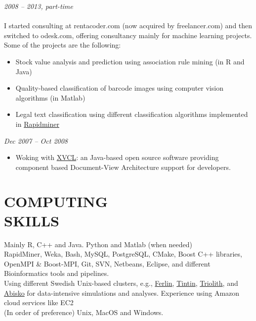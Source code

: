 \documentclass[margin, 10pt]{res} %
\begin{document}
\begin{resume}
{\sl \textbf{}} \hfill \textit{2008 -- 2013, part-time} \\
{\color{RubineRed}{Upwork (formerly Odesk)} } \\
I started consulting at rentacoder.com (now acquired by freelancer.com) and then switched to odesk.com, offering consultancy mainly for machine learning projects. Some of the projects are the following: 
\begin{itemize} \itemsep -2pt %
\item Stock value analysis and prediction using association rule mining (in R and Java)
\item Quality-based classification of barcode images using computer vision algorithms (in Matlab)
\item Legal text classification using different classification algorithms implemented in \href{https://rapidminer.com/}{Rapidminer} 
\end{itemize} 

 
{\sl \textbf{}} \hfill \textit{Dec 2007 -- Oct 2008} \\
{\color{RubineRed}{Computer Science Department, LUMS, Pakistan}} 
\begin{itemize} 
\item Woking with \href{http://www.sciencedirect.com/science/article/pii/S0167642304000978}{XVCL}: an Java-based open source software providing component based Document-View Architecture support for developers. 
\end{itemize} 



\section{COMPUTING \\ SKILLS} 

{\bf \color{Brown}{Languages:}} 
Mainly R, C++ and Java. Python and Matlab (when needed)\\
{\bf \color{Brown}{Misc Tools:}} RapidMiner, Weka, Bash, MySQL, PostgreSQL, CMake, Boost C++ libraries, OpenMPI \& Boost-MPI, Git, SVN, Netbeans, Eclipse, and different Bioinformatics tools and pipelines. \\
{\bf \color{Brown}{HPC Clusters:}} Using different Swedish Unix-based clusters, e.g., \href{https://www.pdc.kth.se/resources/computers/historical-computers/ferlin}{Ferlin}, \href{http://www.uppmax.uu.se/}{Tintin}, \href{https://www.nsc.liu.se/systems/triolith/}{Triolith}, and \href{http://www.hpc2n.umu.se/resources/abisko}{Abisko} for data-intensive simulations and analyses. Experience using Amazon cloud services like EC2 \\
{\bf \color{Brown}{Operating Systems:}} (In order of preference) Unix, MacOS and Windows.


\end{resume}
\end{document}
